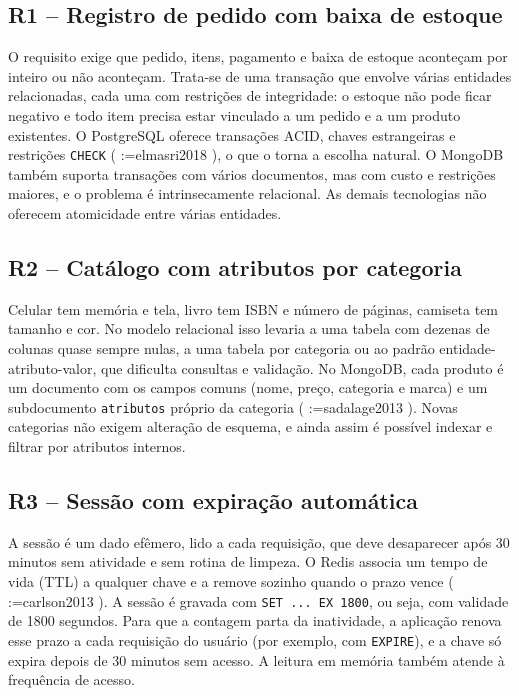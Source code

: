 \documentclass[12pt,a4paper,oneside]{article}
\makeatletter
\newcommand{\tys@getpar}[1]{%
  \@ifundefined{cite@#1}{\textbf{??#1??}}{\@nameuse{cite@#1}}%
}
\newif\iftysfirst
\newcommand{\tys@listpar}[1]{%
  \tysfirsttrue
  \@for\tys@key:=#1\do{%
    \iftysfirst\tysfirstfalse\else; \fi
    \expandafter\tys@getpar\expandafter{\tys@key}%
  }%
}
\renewcommand{\cite}[1]{(\tys@listpar{#1})}
\makeatother
\begin{document}
\subsection{R1 -- Registro de pedido com baixa de estoque}

O requisito exige que pedido, itens, pagamento e baixa de estoque aconteçam por inteiro ou não aconteçam. Trata-se de uma transação que envolve várias entidades relacionadas, cada uma com restrições de integridade: o estoque não pode ficar negativo e todo item precisa estar vinculado a um pedido e a um produto existentes. O PostgreSQL oferece transações ACID, chaves estrangeiras e restrições \texttt{CHECK} \cite{elmasri2018}, o que o torna a escolha natural. O MongoDB também suporta transações com vários documentos, mas com custo e restrições maiores, e o problema é intrinsecamente relacional. As demais tecnologias não oferecem atomicidade entre várias entidades.

\subsection{R2 -- Catálogo com atributos por categoria}

Celular tem memória e tela, livro tem ISBN e número de páginas, camiseta tem tamanho e cor. No modelo relacional isso levaria a uma tabela com dezenas de colunas quase sempre nulas, a uma tabela por categoria ou ao padrão entidade-atributo-valor, que dificulta consultas e validação. No MongoDB, cada produto é um documento com os campos comuns (nome, preço, categoria e marca) e um subdocumento \texttt{atributos} próprio da categoria \cite{sadalage2013}. Novas categorias não exigem alteração de esquema, e ainda assim é possível indexar e filtrar por atributos internos.

\subsection{R3 -- Sessão com expiração automática}

A sessão é um dado efêmero, lido a cada requisição, que deve desaparecer após 30 minutos sem atividade e sem rotina de limpeza. O Redis associa um tempo de vida (TTL) a qualquer chave e a remove sozinho quando o prazo vence \cite{carlson2013}. A sessão é gravada com \texttt{SET ... EX 1800}, ou seja, com validade de 1800 segundos. Para que a contagem parta da inatividade, a aplicação renova esse prazo a cada requisição do usuário (por exemplo, com \texttt{EXPIRE}), e a chave só expira depois de 30 minutos sem acesso. A leitura em memória também atende à frequência de acesso.
\end{document}
